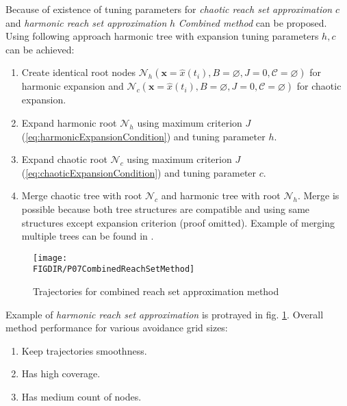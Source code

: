Because of existence of tuning parameters for \emph{chaotic reach set approximation} $c$ and \emph{harmonic reach set approximation} $h$ \emph{Combined method} can be proposed. Using following approach harmonic tree with expansion tuning parameters $h,c$ can be achieved:
\begin{enumerate}
    \item Create identical root nodes $\mathscr{N}_h(\textbf{x}=\hat{x}(t_i),B=\varnothing,J=0,\mathscr{C}=\varnothing)$ for harmonic expansion and $\mathscr{N}_c(\textbf{x}=\hat{x}(t_i),B=\varnothing,J=0,\mathscr{C}=\varnothing)$ for chaotic expansion.
    \item Expand harmonic root $\mathscr{N}_h$ using maximum criterion $J$ (\ref{eq:harmonicExpansionCondition}) and tuning parameter $h$.
    \item Expand chaotic root $\mathscr{N}_c$ using maximum criterion $J$ (\ref{eq:chaoticExpansionCondition}) and tuning parameter $c$.
    \item Merge chaotic tree with root $\mathscr{N}_c$  and harmonic tree with  root $\mathscr{N}_h$. Merge is possible because both tree structures are compatible and using same structures except expansion criterion (proof omitted). Example of merging multiple trees can be found in \cite{o1996log}.
\end{enumerate}

\begin{figure}[H]
    \centering
    \texttt{[image: \\FIGDIR/P07CombinedReachSetMethod]}
    \caption{Trajectories for combined reach set approximation method}
    \label{fig:P07CombinedReachSetMethod}
\end{figure}

\noindent Example of \emph{harmonic reach set approximation} is protrayed in fig. \ref{fig:P07CombinedReachSetMethod}. Overall method performance for various avoidance grid sizes:
\begin{enumerate}
    \item Keep trajectories smoothness.
    \item Has high coverage.
    \item Has medium count of nodes.
\end{enumerate}







